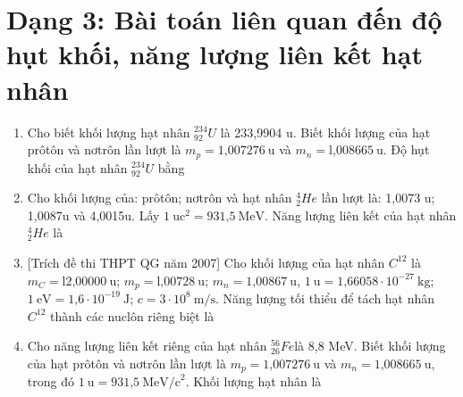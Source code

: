 \section{Dạng 3: Bài toán liên quan đến độ hụt khối, năng lượng liên kết hạt nhân}
\begin{enumerate}
	\item {Cho biết khối lượng hạt nhân $^{234}_{92}U$ là 233,9904 u. Biết khối lượng của hạt prôtôn và nơtrôn lần lượt là $m_p= \text{1,007276}\ \text{u}$ và $m_n= \text{l,008665}\ \text{u}$. Độ hụt khối của hạt nhân $^{234}_{92}U$ bằng
	}
	\item {Cho khối lượng của: prôtôn; nơtrôn và hạt nhân $^4_2He$ lần lượt là: 1,0073 u; 1,0087u và  4,0015u. Lấy $1\ \text{uc}^2 =\text{931,5}\ \text{MeV}$. Năng lượng liên kết của hạt nhân $^4_2He$ là
	}
	\item{[Trích đề thi THPT QG năm 2007] Cho khối lượng của hạt nhân $C^{12}$ là  $m_C  = \text{l2,00000}\ \text{u}$; $m_p = \text{l,00728}\ \text{u}$; $m_n =\text{1,00867}\ \text{u}$, $1\ \text{u}=\text{1,66058}\cdot 10^{-27}\ \text{kg}$;  $1\ \text{eV}= \text{1,6}\cdot 10^{-19}\ \text{J}$; $c = 3\cdot 10^8\ \text{m/s}$. Năng lượng tối thiểu để tách hạt nhân $C^{12}$ thành các nuclôn riêng biệt là
	}
	\item{Cho năng lượng liên kết riêng của hạt nhân $^{56}_{26} Fe$là 8,8 MeV. Biết khối lượng của hạt prôtôn và nơtrôn lần lượt là $m_p = \text{1,007276}\ \text{u}$ và $m_n = \text{1,008665}\ \text{u}$, trong đó $1\ \text{u} = \text{931,5}\ \text{MeV/c}^2$. Khối lượng hạt nhân   là
}
\end{enumerate}
